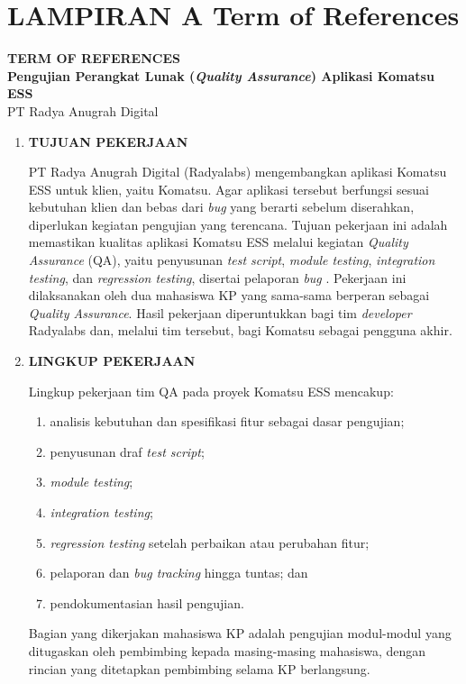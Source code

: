 \clearpage
\section*{LAMPIRAN A Term of References}
\label{app:tor}

\begin{framed}
\begin{center}
{\bfseries\Large TERM OF REFERENCES}\\[4pt]
{\bfseries Pengujian Perangkat Lunak (\textit{Quality Assurance}) Aplikasi Komatsu ESS}\\[2pt]
PT Radya Anugrah Digital
\end{center}

\begin{enumerate}[label=\arabic*.,leftmargin=1.2cm,itemsep=6pt]

\item \textbf{TUJUAN PEKERJAAN}

PT Radya Anugrah Digital (Radyalabs) mengembangkan aplikasi Komatsu ESS untuk klien, yaitu Komatsu. Agar aplikasi tersebut berfungsi sesuai kebutuhan klien dan bebas dari \textit{bug} yang berarti sebelum diserahkan, diperlukan kegiatan pengujian yang terencana. Tujuan pekerjaan ini adalah memastikan kualitas aplikasi Komatsu ESS melalui kegiatan \textit{Quality Assurance} (QA), yaitu penyusunan \textit{test script}, \textit{module testing}, \textit{integration testing}, dan \textit{regression testing}, disertai pelaporan \textit{bug} . Pekerjaan ini dilaksanakan oleh dua mahasiswa KP yang sama-sama berperan sebagai \textit{Quality Assurance}. Hasil pekerjaan diperuntukkan bagi tim \textit{developer} Radyalabs dan, melalui tim tersebut, bagi Komatsu sebagai pengguna akhir.

\item \textbf{LINGKUP PEKERJAAN}

Lingkup pekerjaan tim QA pada proyek Komatsu ESS mencakup:
\begin{enumerate}[label=\arabic*)]
\item analisis kebutuhan dan spesifikasi fitur sebagai dasar pengujian;
\item penyusunan draf \textit{test script};
\item \textit{module testing};
\item \textit{integration testing};
\item \textit{regression testing} setelah perbaikan atau perubahan fitur;
\item pelaporan dan \textit{bug tracking} hingga tuntas; dan
\item pendokumentasian hasil pengujian.
\end{enumerate}
Bagian yang dikerjakan mahasiswa KP adalah pengujian modul-modul yang ditugaskan oleh pembimbing kepada masing-masing mahasiswa, dengan rincian yang ditetapkan pembimbing selama KP berlangsung.


\end{enumerate}
\end{framed}
